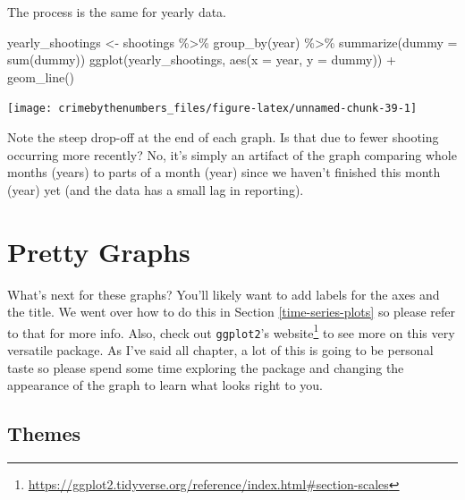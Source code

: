 \documentclass[
]{krantz}
\makeatletter
\newenvironment{Shaded}{\begin{snugshade}}{\end{snugshade}}
\newcommand{\AttributeTok}[1]{\textcolor[rgb]{0.61,0.61,0.61}{#1}}
\newcommand{\FunctionTok}[1]{\textcolor[rgb]{0,0,0}{#1}}
\newcommand{\NormalTok}[1]{#1}
\newcommand{\OtherTok}[1]{\textcolor[rgb]{0.37,0.37,0.37}{#1}}
\newcommand{\SpecialCharTok}[1]{\textcolor[rgb]{0,0,0}{#1}}
\renewcommand{\href}[2]{#2\footnote{\url{#1}}}
\newenvironment{kframe}{%
\medskip{}
\setlength{\fboxsep}{.8em}
 \def\at@end@of@kframe{}%
 \ifinner\ifhmode%
  \def\at@end@of@kframe{\end{minipage}}%
  \begin{minipage}{\columnwidth}%
 \fi\fi%
 \def\FrameCommand##1{\hskip\@totalleftmargin \hskip-\fboxsep
 \colorbox{shadecolor}{##1}\hskip-\fboxsep
     \hskip-\linewidth \hskip-\@totalleftmargin \hskip\columnwidth}%
 \MakeFramed {\advance\hsize-\width
   \@totalleftmargin\z@ \linewidth\hsize
   \@setminipage}}%
 {\par\unskip\endMakeFramed%
 \at@end@of@kframe}
\renewenvironment{Shaded}{\begin{kframe}}{\end{kframe}}
\makeatother
\begin{document}
The process is the same for yearly data.

\begin{Shaded}
\begin{Highlighting}[]
\NormalTok{yearly\_shootings }\OtherTok{\textless{}{-}}\NormalTok{ shootings }\SpecialCharTok{\%\textgreater{}\%} \FunctionTok{group\_by}\NormalTok{(year) }\SpecialCharTok{\%\textgreater{}\%} \FunctionTok{summarize}\NormalTok{(}\AttributeTok{dummy =} \FunctionTok{sum}\NormalTok{(dummy))}
\FunctionTok{ggplot}\NormalTok{(yearly\_shootings, }\FunctionTok{aes}\NormalTok{(}\AttributeTok{x =}\NormalTok{ year, }\AttributeTok{y =}\NormalTok{ dummy)) }\SpecialCharTok{+}
  \FunctionTok{geom\_line}\NormalTok{()}
\end{Highlighting}
\end{Shaded}

\begin{center}\texttt{[image: crimebythenumbers\_files/figure-latex/unnamed-chunk-39-1]} \end{center}

Note the steep drop-off at the end of each graph. Is that due to fewer shooting occurring more recently? No, it's simply an artifact of the graph comparing whole months (years) to parts of a month (year) since we haven't finished this month (year) yet (and the data has a small lag in reporting).

\hypertarget{pretty-graphs}{%
\section{Pretty Graphs}\label{pretty-graphs}}

What's next for these graphs? You'll likely want to add labels for the axes and the title. We went over how to do this in Section \ref{time-series-plots} so please refer to that for more info. Also, check out \texttt{ggplot2}'s \href{https://ggplot2.tidyverse.org/reference/index.html\#section-scales}{website} to see more on this very versatile package. As I've said all chapter, a lot of this is going to be personal taste so please spend some time exploring the package and changing the appearance of the graph to learn what looks right to you.

\hypertarget{themes}{%
\subsection{Themes}\label{themes}}
\end{document}
